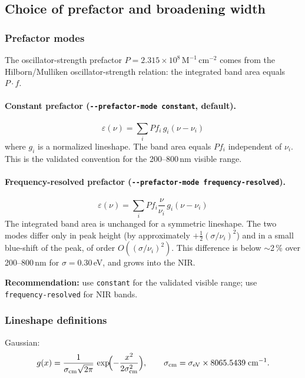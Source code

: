 \documentclass[11pt,a4paper]{article}
\begin{document}
\subsection{Choice of prefactor and broadening width}
\label{sec:prefactor}

\subsubsection*{Prefactor modes}

The oscillator-strength prefactor
\(P = 2.315 \times 10^8\,\text{M}^{-1}\,\text{cm}^{-2}\) comes from
the Hilborn/Mulliken oscillator-strength relation: the integrated band
area equals \(P \cdot f\).

\paragraph{Constant prefactor (\texttt{-{}-prefactor-mode constant}, default).}
\begin{equation}
\varepsilon(\nu) = \sum_i P f_i\, g_i(\nu - \nu_i)
\end{equation}
where \(g_i\) is a normalized lineshape. The band area equals
\(P f_i\) independent of \(\nu_i\). This is the validated convention
for the 200--800\,nm visible range.

\paragraph{Frequency-resolved prefactor (\texttt{-{}-prefactor-mode frequency-resolved}).}
\begin{equation}
\varepsilon(\nu) = \sum_i P f_i \frac{\nu}{\nu_i}\, g_i(\nu - \nu_i)
\end{equation}
The integrated band area is unchanged for a symmetric lineshape. The two
modes differ only in peak height (by approximately
\(+\tfrac{1}{2}(\sigma/\nu_i)^2\)) and in a small blue-shift of the peak,
of order \(O((\sigma/\nu_i)^2)\). This difference is below \(\sim\)2\,\%
over 200--800\,nm for \(\sigma = 0.30\)\,eV, and grows into the NIR.

\textbf{Recommendation:} use \texttt{constant} for the validated visible
range; use \texttt{frequency-resolved} for NIR bands.

\subsubsection*{Lineshape definitions}

Gaussian:
\begin{equation}
g(x) = \frac{1}{\sigma_{\text{cm}}\sqrt{2\pi}}\,
        \exp\!\Bigl(-\frac{x^2}{2\sigma_{\text{cm}}^2}\Bigr),
\qquad \sigma_{\text{cm}} = \sigma_{\text{eV}} \times 8065.5439\;\text{cm}^{-1}.
\end{equation}
\end{document}
